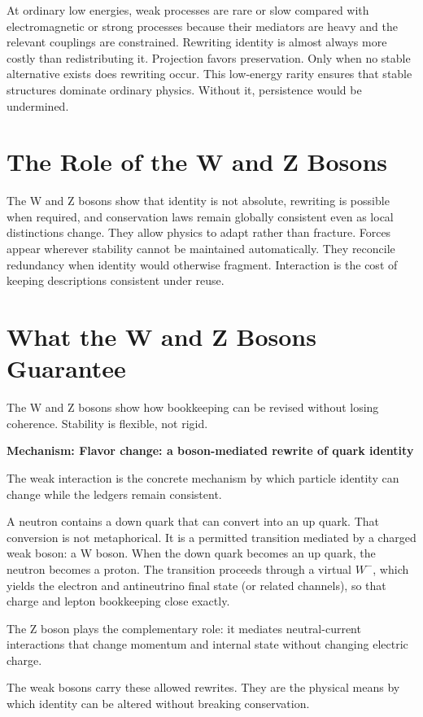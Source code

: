 \documentclass[11pt,twoside,openright]{book}
\newenvironment{mechanismbox}[1]
  {\begin{framed}\noindent\textbf{Mechanism: #1}\par\medskip}
  {\end{framed}}
\begin{document}
At ordinary low energies, weak processes are rare or slow compared with electromagnetic or strong processes because their mediators are heavy and the relevant couplings are constrained. Rewriting identity is almost always more costly than redistributing it. Projection favors preservation. Only when no stable alternative exists does rewriting occur. This low-energy rarity ensures that stable structures dominate ordinary physics. Without it, persistence would be undermined.

\section*{The Role of the W and Z Bosons}

The W and Z bosons show that identity is not absolute, rewriting is possible when required, and conservation laws remain globally consistent even as local distinctions change. They allow physics to adapt rather than fracture. Forces appear wherever stability cannot be maintained automatically. They reconcile redundancy when identity would otherwise fragment. Interaction is the cost of keeping descriptions consistent under reuse.

\section*{What the W and Z Bosons Guarantee}

The W and Z bosons show how bookkeeping can be revised without losing coherence. Stability is flexible, not rigid.

\begin{mechanismbox}{Flavor change: a boson-mediated rewrite of quark identity}
The weak interaction is the concrete mechanism by which particle identity can change while the ledgers remain consistent.

A neutron contains a down quark that can convert into an up quark. That conversion is not metaphorical. It is a permitted transition mediated by a charged weak boson: a W boson. When the down quark becomes an up quark, the neutron becomes a proton. The transition proceeds through a virtual \(W^{-}\), which yields the electron and antineutrino final state (or related channels), so that charge and lepton bookkeeping close exactly.

The Z boson plays the complementary role: it mediates neutral-current interactions that change momentum and internal state without changing electric charge.

The weak bosons carry these allowed rewrites. They are the physical means by which identity can be altered without breaking conservation.
\end{mechanismbox}
\end{document}
